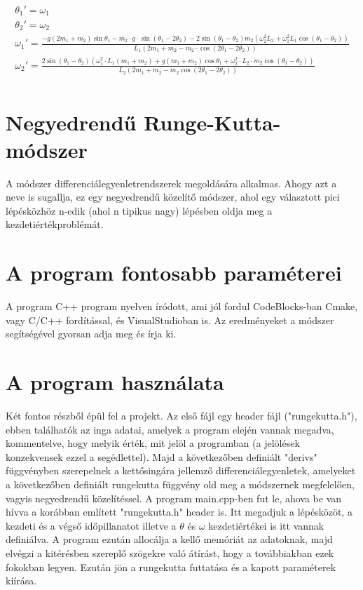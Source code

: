 \documentclass{article}
\begin{document}
\begin{gather*}
\theta_1' = \omega_1 \\
\theta_2' = \omega_2 \\
\omega_1' = \frac{-g(2m_1+m_2)\sin \theta_1 - m_2\cdot g \cdot \sin(\theta_1-2\theta_2) - 2 \sin(\theta_1 - \theta_2)
m_2(\omega_2^2 L_2 + \omega_1^2 L_1 \cos(\theta_1 - \theta_2))}{L_1(2m_1 + m_2 - m_2 \cdot \cos(2\theta_1 - 2 \theta_2))} \\
\omega_2'=\frac{2 \sin(\theta_1 - \theta_2)(\omega_1^2 \cdot L_1(m_1+m_2) + g(m_1+m_2) \cos \theta_1 + \omega_2^2 \cdot L_2 
\cdot m_2 \cos(\theta_1-\theta_2))}{L_2(2m_1+m_2-m_2\cos(2\theta_1 - 2 \theta_2))} \\
\end{gather*}

\section{Negyedrendű Runge-Kutta-módszer}
A módszer differenciálegyenletrendszerek megoldására alkalmas. Ahogy azt a neve is sugallja, ez egy negyedrendű közelítő módszer, 
ahol egy választott pici lépésközhöz n-edik (ahol n tipikus nagy) lépésben oldja meg a kezdetiértékproblémát.

\section{A program fontosabb paraméterei}
A program C++ program nyelven íródott, ami jól fordul CodeBlocks-ban Cmake, vagy C/C++ fordítással, és VisualStudioban is. Az
eredményeket a módszer segítségével gyorsan adja meg és írja ki.

\section{A program használata}
Két fontos részből épül fel a projekt. Az első fájl egy header fájl ("rungekutta.h"), ebben találhatók az inga adatai, amelyek a 
program elején vannak megadva, kommentelve, hogy melyik érték, mit jelöl a programban (a jelölések konzekvensek ezzel a segédlettel). 
Majd a következőben definiált "derivs" függvényben szerepelnek a kettősingára jellemző differenciálegyenletek, amelyeket a következőben 
definiált rungekutta függvény old meg a módszernek megfelelően, vagyis negyedrendű közelítéssel.
\newline
A program main.cpp-ben fut le, ahova be van hívva a korábban említett "rungekutta.h" header is. Itt megadjuk a lépésközöt, a kezdeti 
és a végső időpillanatot illetve a $\theta$ és $\omega$ kezdetiértékei is itt vannak definiálva. A program ezután allocálja a kellő 
memóriát az adatoknak, majd elvégzi a kitérésben szereplő szögekre való átírást, hogy a továbbiakban ezek fokokban legyen. Ezután jön
a rungekutta futtatása és a kapott paraméterek kiírása.
\end{document}
